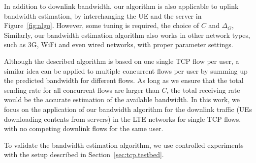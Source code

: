 
In addition to downlink bandwidth, our algorithm is also applicable to uplink bandwidth estimation, by interchanging the UE and the server in Figure~\ref{fig:algo}. However, some tuning is required, \eg the choice of $C$ and $\Delta_{G}$, \etc Similarly, our bandwidth estimation algorithm also works in other network types, such as 3G, WiFi and even wired networks, with proper parameter settings.

Although the described algorithm is based on one single TCP flow per user, a similar idea can be applied to multiple concurrent flows per user by summing up the predicted bandwidth for different flows. As long as we ensure that the total sending rate for all concurrent flows are larger than $C$, the total receiving rate would be the accurate estimation of the available bandwidth. In this work, we focus on the application of our bandwidth algorithm for the downlink traffic (UEs downloading contents from servers) in the LTE networks for single TCP flows, \ie with no competing downlink flows for the same user.


To validate the bandwidth estimation algorithm, we use controlled experiments with the setup described in Section~\ref{sec:tcp.testbed}.

\begin{figure}[t]
\centering
{}\\
\label{fig:bw.time}
\end{figure}

\begin{figure}[t]
\centering
{}\\
\label{fig:bw.cdf}
\end{figure}

